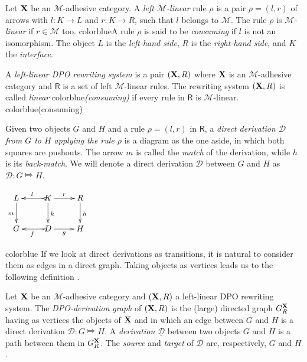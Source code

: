 \documentclass[a4paper,UKenglish,cleveref,pdftex,thm-restate,numberwithinsect,anonymous]{lipics}
\newcommand{\full}[1]{{color{blue}#1}}
\newcommand{\full}[1]{}
\def\R{\mathsf{R}}
\def\X{\textbf {\textup{X}}}
\def\G{\textbf {\textup{G}}}
\newcommand{\dder}[1]{\mathscr{#1}}
\newcommand{\der}[1]{\underline{\dder{#1}}}
\def\gpo{\mathsf{G}^{\X}_R}
\begin{document}
\begin{definition}
  Let $\X$ be an $\mathcal{M}$-adhesive category. A \emph{left
    $\mathcal{M}$-linear} rule $\rho$ is a pair $\rho = (l,r)$ of
  arrows with $l: K \to L$ and $r: K \to R$, such that $l$ belongs to
  $\mathcal{M}$.  The rule $\rho$ is \emph{$\mathcal{M}$-linear} if
  $r\in \mathcal{M}$ too.
  \full{A rule $\rho$ is said to be
    \emph{consuming} if $l$ is not an isomorphism.}%
  The object $L$ is
  the \emph{left-hand side}, $R$ is the \emph{right-hand side}, and
  $K$ the \emph{interface}. 

  A \emph{left-linear DPO rewriting system} is a pair $(\X, \R)$ where
  $\X$ is an $\mathcal{M}$-adhesive category and $\R$ is a set of left
  $\mathcal{M}$-linear rules. The rewriting system $(\X, \R)$ is
  called \emph{linear}
  \full{\emph{(consuming)}}
  if every rule in $\R$ is
  $\mathcal{M}$-linear.
  \full{(consuming)}

  \noindent
  \parbox{10cm}{\hspace{15pt}Given two objects $G$ and $H$ and a rule
    $\rho=(l,r)$ in $\R$, a \emph{direct derivation $\mathscr{D}$ from
      $G$ to $H$ applying the rule $\rho$} is a diagram as the one
    aside, in which both squares are pushouts. The arrow $m$ is called
    the \emph{match} of the derivation, while $h$ is its
    \emph{back-match}.  We will denote a direct derivation $\dder{D}$
    between $G$ and $H$ as $\dder{D}\colon G\Mapsto H$. }
  \parbox{3cm}{$\xymatrix{L \ar[d]_{m}& K \ar[d]^{k}\ar@{>->}[l]_{l}
      \ar[r]^{r} & R \ar[d]^{h}\\G & \ar@{>->}[l]^{f} D \ar[r]_{g}&
      H}$}
\end{definition}


\full{
  If we look at direct derivations as
  transitions, it is natural to consider them as edges in a direct
  graph. Taking objects as vertices leads us to the following
  definition \cite{heindel2009category}.

  \begin{definition}
    Let  $\X$ be an $\mathcal{M}$-adhesive category and 
    $(\X, \R)$ a left-linear DPO rewriting system. 
    The \emph{DPO-derivation graph} of
    $(\X, \R)$ is the (large) directed graph $\gpo$ having as vertices
    the objects of $\X$ and in which an edge between $G$ and $H$ is a
    direct derivation $\dder{D}\colon G\Mapsto H$. A \emph{derivation}
    $\der{D}$ between two objects $G$ and $H$ is a path between them
    in $\gpo$. The \emph{source} and \emph{target} of $\der{D}$ are,
    respectively, $G$ and $H$.
  \end{definition}
}
\end{document}
